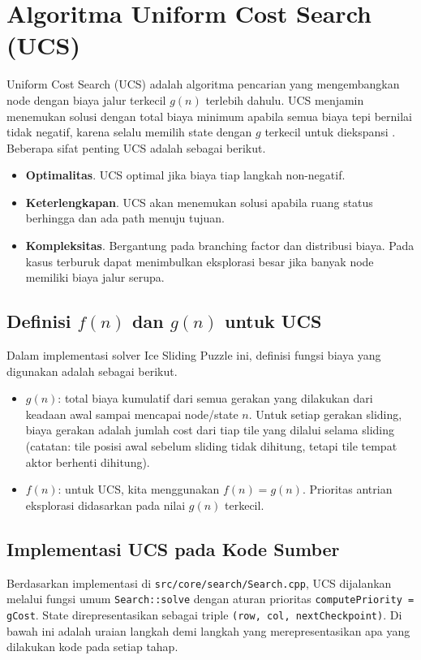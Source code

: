\section{Algoritma Uniform Cost Search (UCS)}

Uniform Cost Search (UCS) adalah algoritma pencarian yang mengembangkan node dengan biaya jalur terkecil $g(n)$ terlebih dahulu. UCS menjamin menemukan solusi dengan total biaya minimum apabila semua biaya tepi bernilai tidak negatif, karena selalu memilih state dengan $g$ terkecil untuk diekspansi \cite{dijkstra1959note,russell2010artificial}. Beberapa sifat penting UCS adalah sebagai berikut.
\begin{itemize}
    \item \textbf{Optimalitas}. UCS optimal jika biaya tiap langkah non-negatif.
    \item \textbf{Keterlengkapan}. UCS akan menemukan solusi apabila ruang status berhingga dan ada path menuju tujuan.
    \item \textbf{Kompleksitas}. Bergantung pada branching factor dan distribusi biaya. Pada kasus terburuk dapat menimbulkan eksplorasi besar jika banyak node memiliki biaya jalur serupa.
\end{itemize}

\subsection{Definisi $f(n)$ dan $g(n)$ untuk UCS}
Dalam implementasi solver Ice Sliding Puzzle ini, definisi fungsi biaya yang digunakan adalah sebagai berikut.
\begin{itemize}
    \item $g(n)$: total biaya kumulatif dari semua gerakan yang dilakukan dari keadaan awal sampai mencapai node/state $n$. Untuk setiap gerakan sliding, biaya gerakan adalah jumlah cost dari tiap tile yang dilalui selama sliding (catatan: tile posisi awal sebelum sliding tidak dihitung, tetapi tile tempat aktor berhenti dihitung).
    \item $f(n)$: untuk UCS, kita menggunakan $f(n)=g(n)$. Prioritas antrian eksplorasi didasarkan pada nilai $g(n)$ terkecil.
\end{itemize}

\subsection{Implementasi UCS pada Kode Sumber}
Berdasarkan implementasi di \texttt{src/core/search/Search.cpp}, UCS dijalankan melalui fungsi umum \texttt{Search::solve} dengan aturan prioritas \texttt{computePriority = gCost}. State direpresentasikan sebagai triple \texttt{(row, col, nextCheckpoint)}. Di bawah ini adalah uraian langkah demi langkah yang merepresentasikan apa yang dilakukan kode pada setiap tahap.


